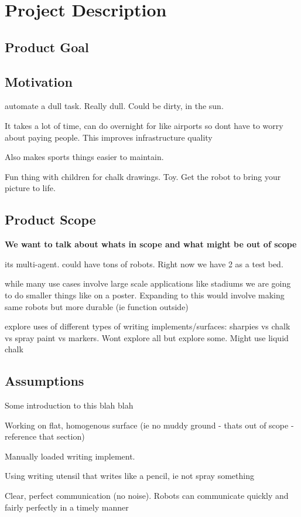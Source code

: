 
\section{Project Description}
\label{sec:project_description}

\subsection{Product Goal}


\subsection{Motivation}
automate a dull task. Really dull. Could be dirty, in the sun. 

It takes a lot of time, can do overnight for like airports so dont have to worry about paying people. This improves infrastructure quality

Also makes sports things easier to maintain.

Fun thing with children for chalk drawings. Toy. Get the robot to bring your picture to life. 

\subsection{Product Scope}
\textbf{We want to talk about whats in scope and what might be out of scope}

its multi-agent. could have tons of robots. Right now we have 2 as a test bed. 

while many use cases involve large scale applications like stadiums we are going to do smaller things like on a poster. Expanding to this would involve making same robots but more durable (ie function outside)

explore uses of different types of writing implements/surfaces: sharpies vs chalk vs spray paint vs markers. Wont explore all but explore some. Might use liquid chalk

\subsection{Assumptions}
Some introduction to this blah blah
\begin{list}{A:~}{}
\item Working on flat, homogenous surface (ie no muddy ground - thats out of scope - reference that section)
\item Manually loaded writing implement. 
\item Using writing utensil that writes like a pencil, ie not spray something
\item Clear, perfect communication (no noise). Robots can communicate quickly and fairly perfectly in a timely manner
\end{list}

